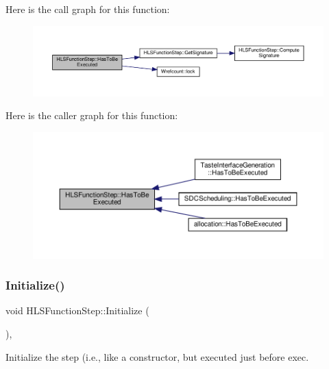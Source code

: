 Here is the call graph for this function\+:
\nopagebreak
\begin{figure}[H]
\begin{center}
\leavevmode
\includegraphics[width=350pt]{d9/d41/classHLSFunctionStep_ac70d2df8fd475639bf9b5c8d492b2d62_cgraph}
\end{center}
\end{figure}
Here is the caller graph for this function\+:
\nopagebreak
\begin{figure}[H]
\begin{center}
\leavevmode
\includegraphics[width=350pt]{d9/d41/classHLSFunctionStep_ac70d2df8fd475639bf9b5c8d492b2d62_icgraph}
\end{center}
\end{figure}
\mbox{\label{classHLSFunctionStep_a966629ba62a8188ff4fa783ab0d4e319}} 
\subsubsection{\texorpdfstring{Initialize()}{Initialize()}}
{\footnotesize\ttfamily void H\+L\+S\+Function\+Step\+::\+Initialize (\begin{DoxyParamCaption}{ }\end{DoxyParamCaption})\hspace{0.3cm}{\ttfamily [override]}, {\ttfamily [virtual]}}



Initialize the step (i.\+e., like a constructor, but executed just before exec. 



